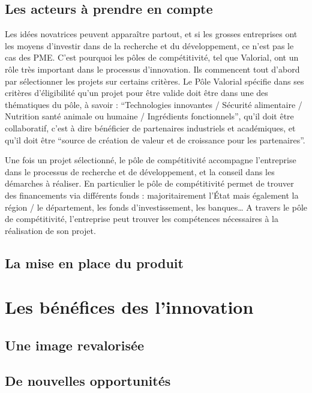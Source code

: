 \documentclass[a4paper,12pt]{report}
\begin{document}
		\subsection{Les acteurs à prendre en compte}
			Les idées novatrices peuvent apparaître partout, et si les grosses entreprises ont les moyens d’investir dans de la recherche et du développement, ce n’est pas le cas des PME. C’est pourquoi les pôles de compétitivité, tel que Valorial, ont un rôle très important dans le processus d’innovation. Ils commencent tout d’abord par sélectionner les projets sur certains critères. Le Pôle Valorial spécifie dans ses critères d’éligibilité\cite{Eligibilite} qu’un projet pour être valide doit être dans une des thématiques du pôle, à savoir : “Technologies innovantes / Sécurité alimentaire / Nutrition santé animale ou humaine / Ingrédients fonctionnels”, qu’il doit être collaboratif, c’est à dire bénéficier de partenaires industriels et académiques, et qu’il doit être “source de création de valeur et de croissance pour les partenaires”.
			
			Une fois un projet sélectionné, le pôle de compétitivité accompagne l’entreprise dans le processus de recherche et de développement, et la conseil dans les démarches à réaliser. En particulier le pôle de compétitivité permet de trouver des financements via différents fonds : majoritairement l’État mais également la région / le département, les fonds d’investissement, les banques…
			A travers le pôle de compétitivité, l’entreprise peut trouver les compétences nécessaires à la réalisation de son projet.
				
		\subsection{La mise en place du produit}
			
	\section{Les bénéfices des l'innovation}
		
		\subsection{Une image revalorisée}
				
		\subsection{De nouvelles opportunités}
				
\end{document}
